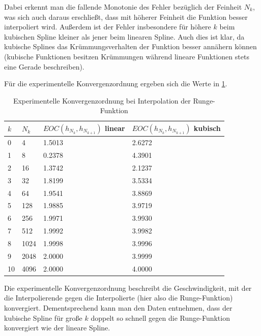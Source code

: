 \documentclass[a4paper, 11pt, ngerman]{scrartcl}
\begin{document}
Dabei erkennt man die fallende Monotonie des Fehler bezüglich der Feinheit $N_k$, was sich auch daraus erschließt, dass mit höherer Feinheit die Funktion besser interpoliert wird. Außerdem ist der Fehler insbesondere für höhere $k$ beim kubischen Spline kleiner als jener beim linearen Spline. Auch dies ist klar, da kubische Splines das Krümmungsverhalten der Funktion besser annähern können (kubische Funktionen besitzen Krümmungen während lineare Funktionen stets eine Gerade beschreiben).

Für die experimentelle Konvergenzordnung ergeben sich die Werte in \cref{tab: ffehlerexp}.

\begin{table}[h]
	\centering
	\begin{tabular}{ll|l|l}
		\hline
		$k$ & $N_k$ & $EOC(h_{N_k},h_{N_{k+1}})$ linear & $EOC(h_{N_k},h_{N_{k+1}})$ kubisch\\
		\hline
		0 & 4 & 1.5013 & 2.6272\\
		\hline
		1 & 8 & 0.2378 & 4.3901\\
		\hline
		2 & 16 & 1.3742 & 2.1237\\
		\hline
		3 & 32 & 1.8199 & 3.5334\\
		\hline
		4 & 64 & 1.9541 & 3.8869\\
		\hline
		5 & 128 & 1.9885 & 3.9719\\
		\hline
		6 & 256 & 1.9971 & 3.9930\\
		\hline
		7 & 512 & 1.9992 & 3.9982\\
		\hline
		8 & 1024 & 1.9998 & 3.9996\\
		\hline
		9 & 2048 & 2.0000 & 3.9999\\
		\hline
		10 & 4096 & 2.0000 & 4.0000\\
		\hline
	\end{tabular}
	\caption{Experimentelle Konvergenzordnung bei Interpolation der Runge-Funktion}
	\label{tab: ffehlerexp}
\end{table}

Die experimentelle Konvergenzordnung beschreibt die Geschwindigkeit, mit der die Interpolierende gegen die Interpolierte (hier also die Runge-Funktion) konvergiert. Dementsprechend kann man den Daten entnehmen, dass der kubische Spline für große $k$ doppelt so schnell gegen die Runge-Funktion konvergiert wie der lineare Spline.

\newpage
\end{document}

